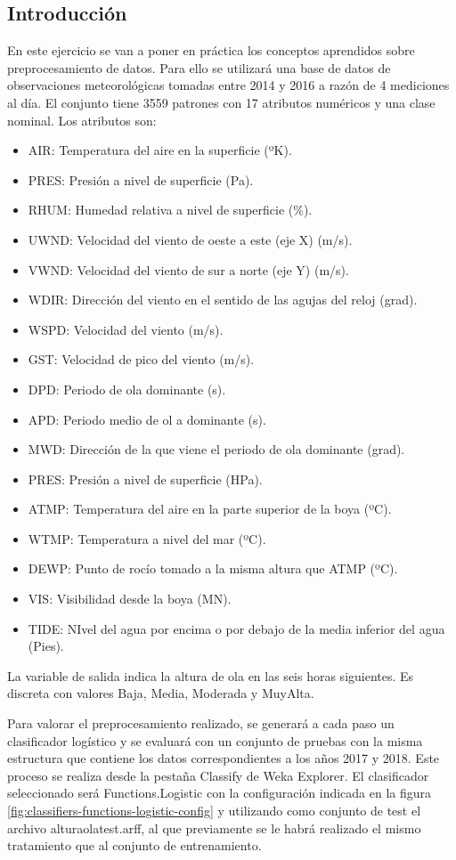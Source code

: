 \subsection{Introducción}
En este ejercicio se van a poner en práctica los conceptos aprendidos sobre preprocesamiento de datos. Para ello se utilizará una base de datos de observaciones meteorológicas tomadas entre 2014 y 2016 a razón de 4 mediciones al día. El conjunto tiene 3559 patrones con 17 atributos numéricos y una clase nominal. Los atributos son:
\begin{itemize}
    \item AIR: Temperatura del aire en la superficie (ºK).
    \item PRES: Presión a nivel de superficie (Pa).
    \item RHUM: Humedad relativa a nivel de superficie (\%).
    \item UWND: Velocidad del viento de oeste a este (eje X) (m/s).
    \item VWND: Velocidad del viento de sur a norte (eje Y) (m/s).
    \item WDIR: Dirección del viento en el sentido de las agujas del reloj (grad).
    \item WSPD: Velocidad del viento (m/s).
    \item GST: Velocidad de pico del viento (m/s).
    \item DPD: Periodo de ola dominante (s).
    \item APD: Periodo medio de ol a dominante (s).
    \item MWD: Dirección de la que viene el periodo de ola dominante (grad).
    \item PRES: Presión a nivel de superficie (HPa).
    \item ATMP: Temperatura del aire en la parte superior de la boya (ºC).
    \item WTMP: Temperatura a nivel del mar (ºC).
    \item DEWP: Punto de rocío tomado a la misma altura que ATMP (ºC).
    \item VIS: Visibilidad desde la boya (MN).
    \item TIDE: NIvel del agua por encima o por debajo de la media inferior del agua (Pies).
\end{itemize}
La variable de salida indica la altura de ola en las seis horas siguientes. Es discreta con valores Baja, Media, Moderada y MuyAlta.

Para valorar el preprocesamiento realizado, se generará a cada paso un clasificador logístico y se evaluará con un conjunto de pruebas con la misma estructura que contiene los datos correspondientes a los años 2017 y 2018. Este proceso se realiza desde la pestaña Classify de Weka Explorer. El clasificador seleccionado será Functions.Logistic con la configuración indicada en la figura \ref{fig:classifiers-functions-logistic-config} y utilizando como conjunto de test el archivo alturaolatest.arff, al que previamente se le habrá realizado el mismo tratamiento que al conjunto de entrenamiento.

